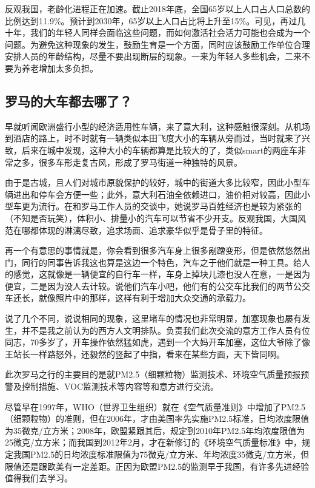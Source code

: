 \documentclass[]{book}
\begin{document}
反观我国，老龄化进程正在加速。截止2018年底，全国65岁以上人口占人口总数的比例达到11.9\%。预计到2030年，65岁以上人口占比将上升至15\%。可见，再过几十年，我们的年轻人同样会面临这些问题，而如何激活社会活力可能也会成为一个问题。为避免这种现象的发生，鼓励生育是一个方面，同时应该鼓励工作单位合理安排人员的年龄结构，尽量不要出现断层的现象。一来为年轻人多些机会，二来不要为养老增加太多负担。

\hypertarget{ux7f57ux9a6cux7684ux5927ux8f66ux90fdux53bbux54eaux4e86}{%
\subsection{罗马的大车都去哪了？}\label{ux7f57ux9a6cux7684ux5927ux8f66ux90fdux53bbux54eaux4e86}}

早就听闻欧洲盛行小型的经济适用性车辆，来了意大利，这种感触很深刻。从机场到酒店的路上，时不时就有一辆类似本田飞度大小的车辆从旁而过，当时就来了兴致，后来在城中发现，这种大小的车辆都算是比较大的了，类似smart的两座车非常之多，很多车形走复古风，形成了罗马街道一种独特的风景。

由于是古城，且人们对城市原貌保护的较好，城中的街道大多比较窄，因此小型车辆进出和停车会方便一些；此外，意大利石油全依赖进口，油价相对较高，因此小型车更为流行。在和罗马工作人员的交谈中，她说罗马百姓经济也是较为紧张的（不知是否玩笑），体积小、排量小的汽车可以节省不少开支。反观我国，大国风范在哪都体现的淋漓尽致，追求场面、追求豪华似乎是骨子里的特征。

再一个有意思的事情就是，你会看到很多汽车身上很多剐蹭变形，但是依然悠然出门，同行的同事告诉我这也算是这边一个特色，汽车之于他们就是一种工具。给人的感觉，这就像是一辆便宜的自行车一样，车身上掉块儿漆也没人在意，一是因为便宜，二是因为没人去计较。说他们汽车小吧，他们有的公交车比我们的两节公交车还长，就像照片中的那样，这样有利于增加大众交通的承载力。

说了几个不同，说说相同的现象，这里堵车的情况也非常明显，加塞现象也屡有发生，并不是我之前认为的西方人文明排队。负责我们此次交流的意方工作人员有位同志，70多岁了，开车操作依然猛如虎，遇到一个大妈开车加塞，这位大爷除了像王站长一样路怒外，还毅然的竖起了中指，看来在某些方面，天下皆同啊。

此次罗马之行的主要目的是就PM2.5（细颗粒物）监测技术、环境空气质量预报预警及控制措施、VOC监测技术等内容等和意方进行交流。

尽管早在1997年，WHO（世界卫生组织）就在《空气质量准则》中增加了PM2.5（细颗粒物）的准则，但在2006年，才由美国率先实施PM2.5标准，日均浓度限值为35微克/立方米；2008年，欧盟紧跟其后，规定到2010年PM2.5年均浓度限值为25微克/立方米；而我国到2012年2月，才在新修订的《环境空气质量标准》中，规定我国PM2.5的日均浓度标准限值为75微克/立方米、年均浓度35微克/立方米，但限值还是跟欧美有一定差距。正因为欧盟PM2.5的监测早于我国，有许多先进经验值得我们去学习。
\end{document}
